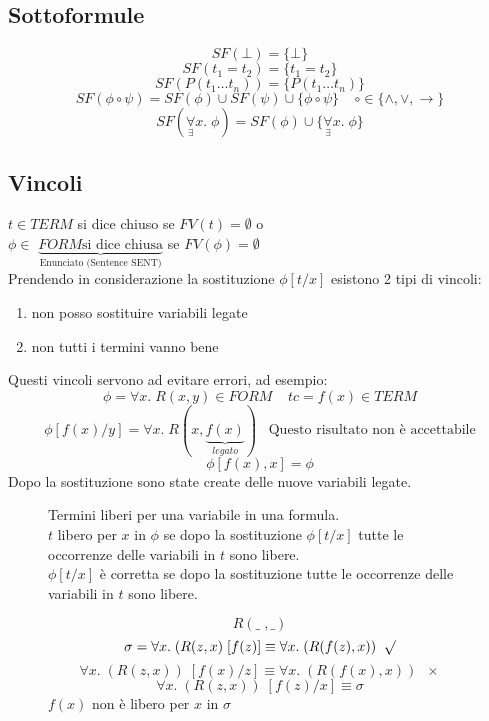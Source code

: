 \documentclass{article}
\theoremstyle{break}
\theoremstyle{break}
\theoremstyle{break}
\theoremstyle{break}
\begin{document}
\subsection{Sottoformule}
\[
SF(\bot) = \{\bot\} 
\] 
\[
SF(t_1 = t_2) = \{t_1 = t_2\} 
\] 
\[
SF(P(t_1 \ldots t_n)) = \{P(t_1 \ldots t_n)\} 
\] 
\[
SF(\phi \circ \psi) = SF(\phi) \cup SF(\psi) \cup \{\phi \circ \psi\}\;\;\;\; \circ \in \{\wedge, \vee, \to \}  
\] 
\[
  SF(\underset{\exists}{\forall}x.\; \phi) = SF(\phi) \cup \{\underset{\exists}{\forall}x.\; \phi\}
\] 
\subsection{Vincoli}
\( t \in TERM \) si dice chiuso se \( FV(t) = \emptyset \) o\\
\( \phi \in \) \( \underbrace{ FORM  \text{si dice chiusa}}_{\text{Enunciato (Sentence SENT)}} \)  se \( FV(\phi) = \emptyset \)
\vspace{1em}\\
Prendendo in considerazione la sostituzione \( \phi[t/x] \) esistono 2 tipi di vincoli:
\begin{enumerate}
  \item non posso sostituire variabili legate
  \item non tutti i termini vanno bene
\end{enumerate}
Questi vincoli servono ad evitare errori, ad esempio:
\[
\phi = \forall x.\; R(x,y) \in FORM\;\;\;\;tc=f(x) \in TERM
\] 
\[
  \phi[f(x)/y] = \forall x.\; R(x, \underbrace{f(x)}_{legato})\;\;\; \text{Questo risultato non è accettabile}
\] 
\[
  \phi[f(x),x] = \phi
\] 
Dopo la sostituzione sono state create delle nuove variabili legate.
\begin{figure}[H]
  \begin{definition}
    Termini liberi per una variabile in una formula.
    \vspace{1em}\\
    \( t \) libero per \( x \) in \( \phi \) se dopo la sostituzione \( \phi[t/x] \) tutte
    le occorrenze delle variabili in \( t \) sono libere.
    \vspace{1em}\\
    \( \phi[t/x] \) è corretta se dopo la sostituzione tutte le occorrenze
    delle variabili in \( t \) sono libere.
  \end{definition}
\end{figure}

\begin{figure}[H]
  \begin{example}
    \[
    R(\_\;,\_)
    \] 
    \[
      \sigma=\forall x.\;(R(z,x)\;[f(z)] \equiv \forall x.\; (R(f(z),x)) \;\;\surd
    \] 
    \[
      \forall x.\; (R(z,x))\;[f(x)/z] \equiv \forall x.\; (R(f(x),x)) \;\;\times
    \] 
    \[
      \forall x.\; (R(z,x))\;[f(z)/x] \equiv \sigma
    \] 
    \( f(x) \) non è libero per \( x \) in \( \sigma \)
  \end{example}
\end{figure}
\end{document}

